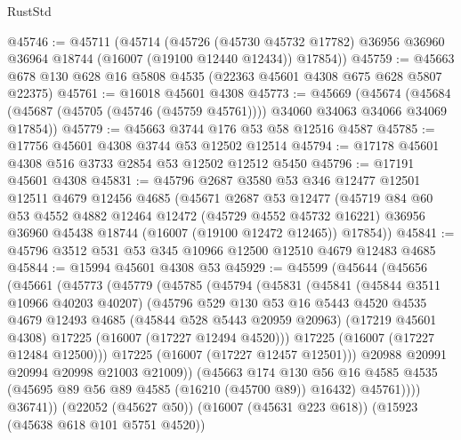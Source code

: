 \begin{lexlean}{RustStd}
\begin{coremodule}
@45746 := @45711
    (@45714
      (@45726
        (@45730 @45732 @17782)
        @36956
        @36960
        @36964
        @18744
        (@16007 (@19100 @12440 @12434))
        @17854))
@45759 := @45663 @678 @130 @628 @16 @5808 @4535 (@22363 @45601 @4308 @675 @628 @5807 @22375)
@45761 := @16018 @45601 @4308
@45773 := @45669
    (@45674 (@45684 (@45687 (@45705 (@45746 (@45759 @45761)))) @34060 @34063 @34066 @34069 @17854))
@45779 := @45663 @3744 @176 @53 @58 @12516 @4587
@45785 := @17756 @45601 @4308 @3744 @53 @12502 @12514
@45794 := @17178 @45601 @4308 @516 @3733 @2854 @53 @12502 @12512 @5450
@45796 := @17191 @45601 @4308
@45831 := @45796
    @2687
    @3580
    @53
    @346
    @12477
    @12501
    @12511
    @4679
    @12456
    @4685
    (@45671
      @2687
      @53
      @12477
      (@45719
        @84
        @60
        @53
        @4552
        @4882
        @12464
        @12472
        (@45729 @4552 @45732 @16221)
        @36956
        @36960
        @45438
        @18744
        (@16007 (@19100 @12472 @12465))
        @17854))
@45841 := @45796 @3512 @531 @53 @345 @10966 @12500 @12510 @4679 @12483 @4685
@45844 := @15994 @45601 @4308 @53
@45929 := @45599
    (@45644
      (@45656
        (@45661
          (@45773
            (@45779
              (@45785
                (@45794
                  (@45831
                    (@45841
                      (@45844 @3511 @10966 @40203 @40207)
                      (@45796
                        @529
                        @130
                        @53
                        @16
                        @5443
                        @4520
                        @4535
                        @4679
                        @12493
                        @4685
                        (@45844 @528 @5443 @20959 @20963)
                        (@17219 @45601 @4308)
                        @17225
                        (@16007 (@17227 @12494 @4520)))
                      @17225
                      (@16007 (@17227 @12484 @12500)))
                    @17225
                    (@16007 (@17227 @12457 @12501)))
                  @20988
                  @20991
                  @20994
                  @20998
                  @21003
                  @21009))
              (@45663
                @174
                @130
                @56
                @16
                @4585
                @4535
                (@45695 @89 @56 @89 @4585 (@16210 (@45700 @89)) @16432)
                @45761))))
        @36741))
    (@22052 (@45627 @50))
    (@16007 (@45631 @223 @618))
    (@15923 (@45638 @618 @101 @5751 @4520))

\end{coremodule}
\end{lexlean}
